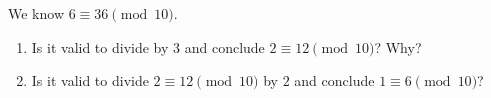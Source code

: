 We know $6\equiv36\pmod{10}$.
\begin{enumerate}
\item[(a)] Is it valid to divide by $3$ and conclude $2\equiv12\pmod{10}$? Why?
\item[(b)] Is it valid to divide $2\equiv12\pmod{10}$ by $2$ and conclude $1\equiv6\pmod{10}$?
\end{enumerate}
